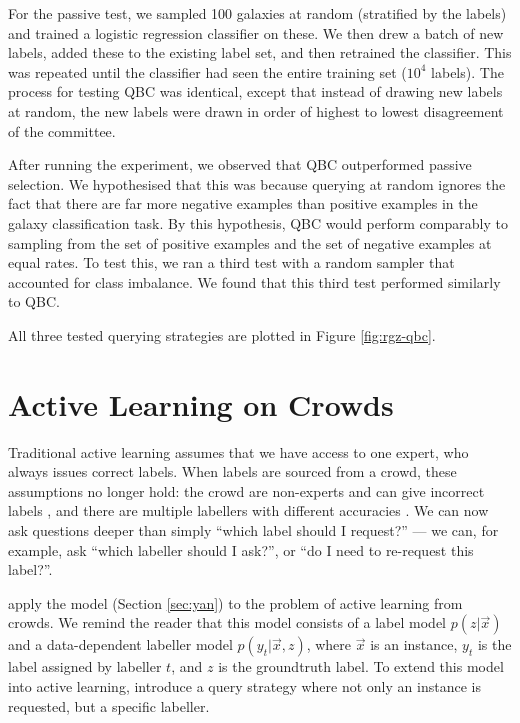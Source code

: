     For the passive test, we sampled 100 galaxies at random (stratified by the
    labels) and trained a logistic regression classifier on these. We then drew
    a batch of new labels, added these to the existing label set, and then
    retrained the classifier. This was repeated until the classifier had seen
    the entire training set ($10^4$ labels). The process for testing QBC was
    identical, except that instead of drawing new labels at random, the new
    labels were drawn in order of highest to lowest disagreement of the
    committee.

    After running the experiment, we observed that QBC outperformed passive
    selection. We hypothesised that this was because querying at random ignores
    the fact that there are far more negative examples than positive examples in
    the galaxy classification task. By this hypothesis, QBC would perform
    comparably to sampling from the set of positive examples and the set of
    negative examples at equal rates. To test this, we ran a third test with a
    random sampler that accounted for class imbalance. We found that this third
    test performed similarly to QBC.

    All three tested querying strategies are plotted in Figure
    \ref{fig:rgz-qbc}.

\section{Active Learning on Crowds}
\label{sec:active-learning-on-crowds}
    
    Traditional active learning assumes that we have access to one expert, who
    always issues correct labels. When labels are sourced from a crowd, these
    assumptions no longer hold: the crowd are non-experts and can give incorrect
    labels \citep{mozafari12,yan11}, and there are multiple labellers with
    different accuracies \citep{yan11}. We can now ask questions deeper than
    simply ``which label should I request?'' --- we can, for example, ask
    ``which labeller should I ask?'', or ``do I need to re-request this
    label?''.

    \citet{yan11} apply the \citet{yan10} model (Section \ref{sec:yan}) to the
    problem of active learning from crowds. We remind the reader that this model
    consists of a label model $p(z | \vec x)$ and a data-dependent labeller
    model $p(y_t | \vec x, z)$, where $\vec x$ is an instance, $y_t$ is the
    label assigned by labeller $t$, and $z$ is the groundtruth label. To extend
    this model into active learning, \citeauthor{yan11} introduce a query
    strategy where not only an instance is requested, but a specific labeller.

